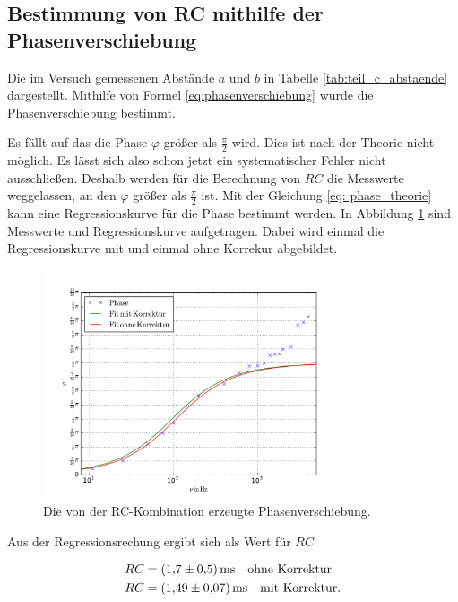\subsection{Bestimmung von RC mithilfe der Phasenverschiebung}
Die im Versuch gemessenen Abstände $a$ und $b$ in Tabelle \ref{tab:teil_c_abstaende}
dargestellt. Mithilfe von Formel \eqref{eq:phasenverschiebung} wurde die
Phasenverschiebung bestimmt.



Es fällt auf das die Phase $\varphi$ größer als $\frac{\pi}{2}$ wird.
Dies ist nach der Theorie nicht möglich.
Es lässt sich also schon jetzt ein systematischer Fehler nicht ausschließen.
Deshalb werden für die Berechnung von $RC$ die Messwerte weggelassen, an den
$\varphi$ größer als $\frac{\pi}{2}$ ist.
Mit der Gleichung \eqref{eq: phase_theorie} kann eine Regressionskurve für die
Phase bestimmt werden.
In Abbildung \ref{fig:plot_teil_c} sind Messwerte und Regressionskurve aufgetragen.
Dabei wird einmal die Regressionskurve mit und einmal ohne Korrekur abgebildet.

\FloatBarrier
\begin{figure}
  \centering
  \includegraphics[width=0.8\textwidth]{pics/frequenz_phase.pdf}
  \caption{Die von der RC-Kombination erzeugte Phasenverschiebung.}
  \label{fig:plot_teil_c}
\end{figure}
\FloatBarrier

Aus der Regressionsrechung ergibt sich als Wert für $RC$

\begin{align}
  \label{eq:teil_c_rc}
  \begin{aligned}
    RC&=\SI{1.7\pm0.5}{\milli\second} \quad \text{ohne Korrektur} \\
    RC& =\SI{1.49\pm0.07}{\milli\second} \quad \text{mit Korrektur}.
\end{aligned}
\end{align}

